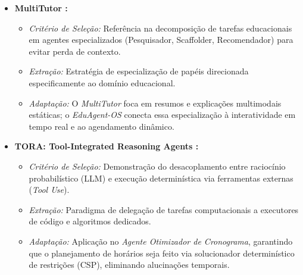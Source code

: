 \documentclass[12pt]{article}
\begin{document}
\begin{itemize}
    \item \textbf{MultiTutor \cite{sun2025multitutor}:}
    \begin{itemize}
        \item \textit{Critério de Seleção:} Referência na decomposição de tarefas educacionais em agentes especializados (Pesquisador, Scaffolder, Recomendador) para evitar perda de contexto.
        \item \textit{Extração:} Estratégia de especialização de papéis direcionada especificamente ao domínio educacional.
        \item \textit{Adaptação:} O \textit{MultiTutor} foca em resumos e explicações multimodais estáticas; o \textit{EduAgent-OS} conecta essa especialização à interatividade em tempo real e ao agendamento dinâmico.
    \end{itemize}

    \item \textbf{TORA: Tool-Integrated Reasoning Agents \cite{guo2024tora}:}
    \begin{itemize}
        \item \textit{Critério de Seleção:} Demonstração do desacoplamento entre raciocínio probabilístico (LLM) e execução determinística via ferramentas externas (\textit{Tool Use}).
        \item \textit{Extração:} Paradigma de delegação de tarefas computacionais a executores de código e algoritmos dedicados.
        \item \textit{Adaptação:} Aplicação no \textit{Agente Otimizador de Cronograma}, garantindo que o planejamento de horários seja feito via solucionador determinístico de restrições (CSP), eliminando alucinações temporais.
    \end{itemize}
\end{itemize}

\newpage


\end{document}
